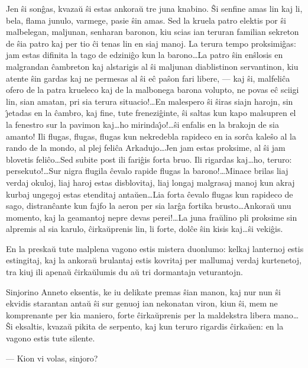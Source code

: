    Jen \^si son\^gas, kvaza\u u \^si estas ankora\u u tre juna knabino. \^Si
senfine amas lin kaj li, bela, flama junulo, varmege, pasie \^sin
amas. Sed la kruela patro elektis por \^si malbelegan, maljunan,
senharan baronon, kiu scias ian teruran familian sekreton de \^sia
patro kaj per tio \^ci tenas lin en siaj manoj. La terura tempo
proksimi\^gas: jam estas difinita la tago de edzini\^go kun la
barono\dots La patro \^sin en\^slosis en malgrandan \^cambreton kaj
alstarigis al \^si maljunan diablistinon servantinon, kiu atente
\^sin gardas kaj ne permesas al \^si e\^c pa\^son fari libere,
--- kaj \^si, malfeli\^ca ofero de la patra krueleco kaj de la
malbonega barona volupto, ne povas e\^c sciigi lin, sian amatan, pri
sia terura situacio!\dots En malespero \^si \^siras siajn harojn,
sin \^{\j}etadas en la \^cambro, kaj fine, tute frenezi\^ginte, \^si
saltas kun kapo malsupren el la fenestro sur la pavimon kaj\dots ho
mirinda\^{\j}o!\dots \^si enfalis en la brakojn de sia amanto! Ili
flugas, flugas, flugas kun nekredebla rapideco en ia sor\^ca
kale\^so al la rando de la mondo, al plej feli\^ca Arkadujo\dots Jen
jam estas proksime, al \^si jam blovetis feli\^co\dots Sed subite
post ili fari\^gis forta bruo. Ili rigardas kaj\dots ho, teruro:
persekuto!\dots Sur nigra flugila \^cevalo rapide flugas la
barono!\dots Minace brilas liaj verdaj okuloj, liaj haroj estas
disblovitaj, liaj longaj malgrasaj manoj kun akraj kurbaj ungegoj
estas etenditaj anta\u uen\dots Lia forta \^cevalo flugas kun
rapideco de sago, distran\^cante kun fajfo la aeron per sia lar\^ga
fortika brusto\dots Ankora\u u unu momento, kaj la geamantoj nepre
devas perei!\dots La juna fra\u ulino pli proksime sin alpremis al
sia karulo, \^cirka\u uprenis lin, li forte, dol\^ce \^sin kisis
kaj\dots \^si veki\^gis.

   En la preska\u u tute malplena vagono estis mistera duonlumo: kelkaj
lanternoj estis estingitaj, kaj la ankora\u u brulantaj estis
kovritaj per mallumaj verdaj kurtenetoj, tra kiuj ili apena\u u
\^cirka\u ulumis du a\u u tri dormantajn veturantojn.

   Sinjorino Anneto eksentis, ke iu delikate premas \^sian manon, kaj nur
nun \^si ekvidis starantan anta\u u \^si sur genuoj ian nekonatan
viron, kiun \^si, mem ne komprenante per kia maniero, forte
\^cirka\u uprenis per la maldekstra libera mano\dots \^Si eksaltis,
kvaza\u u pikita de serpento, kaj kun teruro rigardis \^cirka\u uen:
en la vagono estis tute silente.

 --- Kion vi volas, sinjoro?

